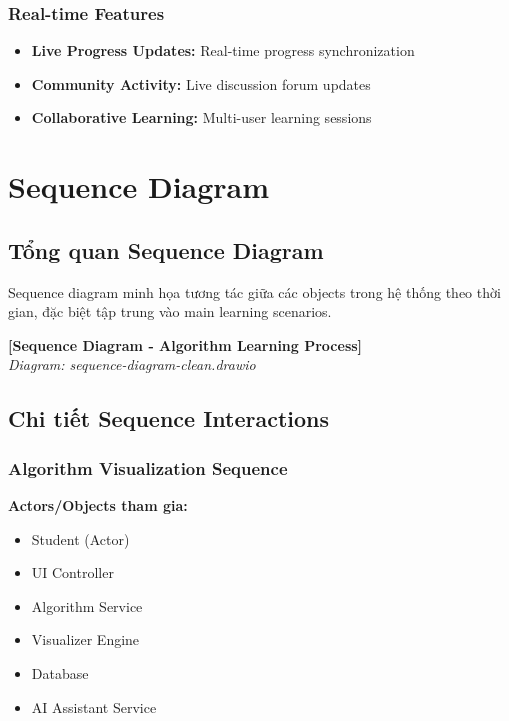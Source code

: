 \subsubsection{Real-time Features}
\begin{itemize}
    \item \textbf{Live Progress Updates:} Real-time progress synchronization
    \item \textbf{Community Activity:} Live discussion forum updates
    \item \textbf{Collaborative Learning:} Multi-user learning sessions
\end{itemize}

\section{Sequence Diagram}
\label{sec:sequence-diagram}

\subsection{Tổng quan Sequence Diagram}
\label{subsec:sequence-overview}

Sequence diagram minh họa tương tác giữa các objects trong hệ thống theo thời gian, đặc biệt tập trung vào main learning scenarios.

\begin{center}
\textbf{[Sequence Diagram - Algorithm Learning Process]}\\
\textit{Diagram: sequence-diagram-clean.drawio}
\end{center}

\subsection{Chi tiết Sequence Interactions}

\subsubsection{Algorithm Visualization Sequence}

\textbf{Actors/Objects tham gia:}
\begin{itemize}
    \item Student (Actor)
    \item UI Controller
    \item Algorithm Service
    \item Visualizer Engine
    \item Database
    \item AI Assistant Service
\end{itemize}

